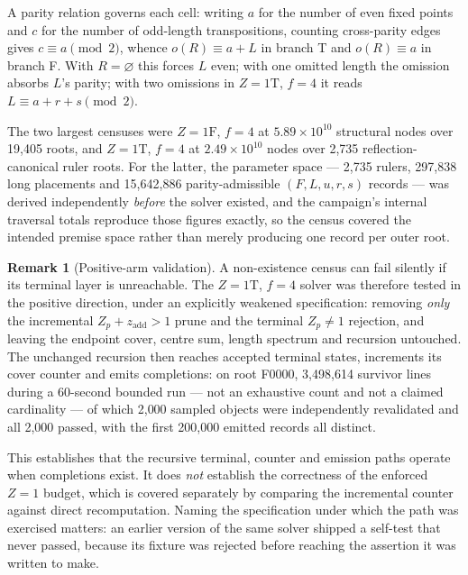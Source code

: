 \documentclass[11pt,a4paper]{article}
\theoremstyle{definition}
\newtheorem{remark}[theorem]{Remark}
\begin{document}
A parity relation governs each cell: writing $a$ for the number of even fixed
points and $c$ for the number of odd-length transpositions, counting
cross-parity edges gives $c\equiv a\pmod2$, whence $o(R)\equiv a+L$ in branch T
and $o(R)\equiv a$ in branch F. With $R=\varnothing$ this forces $L$ even; with
one omitted length the omission absorbs $L$'s parity; with two omissions in
$Z{=}1\mathrm T$, $f=4$ it reads $L\equiv a+r+s\pmod2$.

The two largest censuses were $Z{=}1\mathrm F$, $f=4$ at $5.89\times10^{10}$
structural nodes over 19{,}405 roots, and $Z{=}1\mathrm T$, $f=4$ at
$2.49\times10^{10}$ nodes over 2{,}735 reflection-canonical ruler roots. For the
latter, the parameter space --- 2{,}735 rulers, 297{,}838 long placements and
15{,}642{,}886 parity-admissible $(F,L,u,r,s)$ records --- was derived
independently \emph{before} the solver existed, and the campaign's internal
traversal totals reproduce those figures exactly, so the census covered the
intended premise space rather than merely producing one record per outer root.

\begin{remark}[Positive-arm validation]
\label{rem:t48}
A non-existence census can fail silently if its terminal layer is unreachable.
The $Z{=}1\mathrm T$, $f=4$ solver was therefore tested in the positive
direction, under an explicitly weakened specification: removing \emph{only} the
incremental $Z_p+z_{\mathrm{add}}>1$ prune and the terminal $Z_p\ne1$ rejection,
and leaving the endpoint cover, centre sum, length spectrum and recursion
untouched. The unchanged recursion then reaches accepted terminal states,
increments its cover counter and emits completions: on root F0000, 3{,}498{,}614
survivor lines during a 60-second bounded run --- not an exhaustive count and
not a claimed cardinality --- of which 2{,}000 sampled objects were
independently revalidated and all 2{,}000 passed, with the first 200{,}000
emitted records all distinct.

This establishes that the recursive terminal, counter and emission paths operate
when completions exist. It does \emph{not} establish the correctness of the
enforced $Z=1$ budget, which is covered separately by comparing the incremental
counter against direct recomputation. Naming the specification under which the
path was exercised matters: an earlier version of the same solver shipped a
self-test that never passed, because its fixture was rejected before reaching
the assertion it was written to make.
\end{remark}
\end{document}
